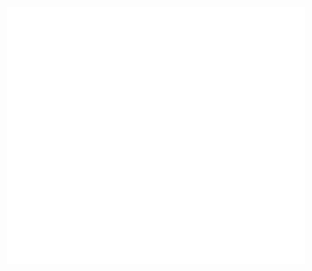 \documentclass[annual]{acmsiggraph}
\begin{document}
\begin{figure}[t]
  \includegraphics[height=3in]{images/Blank.png}
\end{figure}
\end{document}
